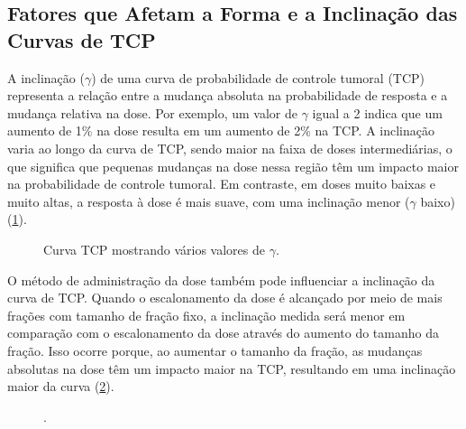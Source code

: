 \documentclass[11pt,a4paper]{article}
\newcounter{exemplo}
\begin{document}
\subsection*{Fatores que Afetam a Forma e a Inclinação das Curvas de TCP}

	A inclinação ($\gamma$) de uma curva de probabilidade de controle tumoral (TCP) representa a relação entre a mudança absoluta na probabilidade de resposta e a mudança relativa na dose. Por exemplo, um valor de $\gamma$ igual a 2 indica que um aumento de 1\% na dose resulta em um aumento de 2\% na TCP. A inclinação varia ao longo da curva de TCP, sendo maior na faixa de doses intermediárias, o que significa que pequenas mudanças na dose nessa região têm um impacto maior na probabilidade de controle tumoral. Em contraste, em doses muito baixas e muito altas, a resposta à dose é mais suave, com uma inclinação menor ($\gamma$ baixo) (\ref{fig:CurvaTcp}).

	\begin{figure}[h]
		\centering
		\caption{Curva TCP mostrando vários valores de $\gamma$.}
		\label{fig:CurvaTcp}
	\end{figure}

	O método de administração da dose também pode influenciar a inclinação da curva de TCP. Quando o escalonamento da dose é alcançado por meio de mais frações com tamanho de fração fixo, a inclinação medida será menor em comparação com o escalonamento da dose através do aumento do tamanho da fração. Isso ocorre porque, ao aumentar o tamanho da fração, as mudanças absolutas na dose têm um impacto maior na TCP, resultando em uma inclinação maior da curva (\ref{fig:curvaTcpDiferentesResistencias}).

	\begin{figure}[h]
		\centering
		\caption{.}
		\label{fig:curvaTcpDiferentesResistencias}
	\end{figure}
\end{document}
